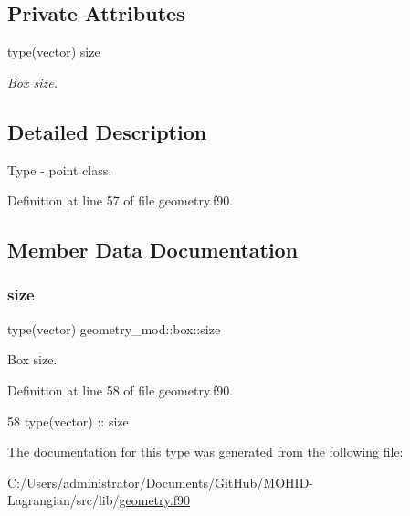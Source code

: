 \subsection*{Private Attributes}
\begin{DoxyCompactItemize}
\item 
type(vector) \mbox{\hyperlink{structgeometry__mod_1_1box_aca87e2761faa8b1ce447347a31fd26f9}{size}}
\begin{DoxyCompactList}\small\item\em Box size. \end{DoxyCompactList}\end{DoxyCompactItemize}


\subsection{Detailed Description}
Type -\/ point class. 

Definition at line 57 of file geometry.\+f90.



\subsection{Member Data Documentation}
\mbox{\label{structgeometry__mod_1_1box_aca87e2761faa8b1ce447347a31fd26f9}} 
\subsubsection{\texorpdfstring{size}{size}}
{\footnotesize\ttfamily type(vector) geometry\+\_\+mod\+::box\+::size\hspace{0.3cm}{\ttfamily [private]}}



Box size. 



Definition at line 58 of file geometry.\+f90.


\begin{DoxyCode}
58         \textcolor{keywordtype}{type}(vector) :: size
\end{DoxyCode}


The documentation for this type was generated from the following file\+:\begin{DoxyCompactItemize}
\item 
C\+:/\+Users/administrator/\+Documents/\+Git\+Hub/\+M\+O\+H\+I\+D-\/\+Lagrangian/src/lib/\mbox{\hyperlink{geometry_8f90}{geometry.\+f90}}\end{DoxyCompactItemize}
